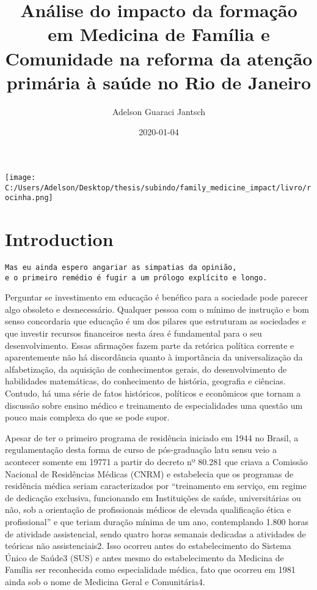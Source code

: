 \documentclass[]{book}
\title{Análise do impacto da formação em Medicina de Família e Comunidade na reforma da atenção primária à saúde no Rio de Janeiro}
\author{Adelson Guaraci Jantsch}
\date{2020-01-04}
\begin{document}
\maketitle

{
\setcounter{tocdepth}{1}
\tableofcontents
}
\hypertarget{section}{%
\chapter*{}\label{section}}

\texttt{[image: C:/Users/Adelson/Desktop/thesis/subindo/family\_medicine\_impact/livro/rocinha.png]}

\hypertarget{introduction}{%
\chapter*{Introduction}\label{introduction}}

\begin{verbatim}
Mas eu ainda espero angariar as simpatias da opinião, 
e o primeiro remédio é fugir a um prólogo explícito e longo.
\end{verbatim}

Perguntar se investimento em educação é benéfico para a sociedade pode parecer algo obsoleto e desnecessário. Qualquer pessoa com o mínimo de instrução e bom senso concordaria que educação é um dos pilares que estruturam as sociedades e que investir recursos financeiros nesta área é fundamental para o seu desenvolvimento. Essas afirmações fazem parte da retórica política corrente e aparentemente não há discordância quanto à importância da universalização da alfabetização, da aquisição de conhecimentos gerais, do desenvolvimento de habilidades matemáticas, do conhecimento de história, geografia e ciências. Contudo, há uma série de fatos históricos, políticos e econômicos que tornam a discussão sobre ensino médico e treinamento de especialidades uma questão um pouco mais complexa do que se pode supor.

Apesar de ter o primeiro programa de residência iniciado em 1944 no Brasil, a regulamentação desta forma de curso de pós-graduação latu sensu veio a acontecer somente em 19771 a partir do decreto nº 80.281 que criava a Comissão Nacional de Residências Médicas (CNRM) e estabelecia que os programas de residência médica seriam caracterizados por ``treinamento em serviço, em regime de dedicação exclusiva, funcionando em Instituições de saúde, universitárias ou não, sob a orientação de profissionais médicos de elevada qualificação ética e profissional'' e que teriam duração mínima de um ano, contemplando 1.800 horas de atividade assistencial, sendo quatro horas semanais dedicadas a atividades de teóricas não assistenciais2. Isso ocorreu antes do estabelecimento do Sistema Único de Saúde3 (SUS) e antes mesmo do estabelecimento da Medicina de Família ser reconhecida como especialidade médica, fato que ocorreu em 1981 ainda sob o nome de Medicina Geral e Comunitária4.
\end{document}
